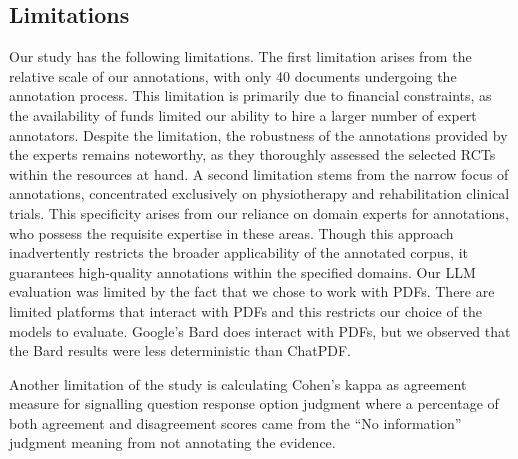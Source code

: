 \documentclass[sn-mathphys,Numbered]{sn-jnl}%
\theoremstyle{thmstyleone}%
\theoremstyle{thmstyletwo}%
\theoremstyle{thmstylethree}%
\begin{document}
\subsection{Limitations}
\label{subsec:limits}
%
Our study has the following limitations.
The first limitation arises from the relative scale of our annotations, with only 40 documents undergoing the annotation process.
This limitation is primarily due to financial constraints, as the availability of funds limited our ability to hire a larger number of expert annotators.
Despite the limitation, the robustness of the annotations provided by the experts remains noteworthy, as they thoroughly assessed the selected RCTs within the resources at hand.
A second limitation stems from the narrow focus of annotations, concentrated exclusively on physiotherapy and rehabilitation clinical trials.
This specificity arises from our reliance on domain experts for annotations, who possess the requisite expertise in these areas.
Though this approach inadvertently restricts the broader applicability of the annotated corpus, it guarantees high-quality annotations within the specified domains.
Our LLM evaluation was limited by the fact that we chose to work with PDFs. 
There are limited platforms that interact with PDFs and this restricts our choice of the models to evaluate.
Google's Bard does interact with PDFs, but we observed that the Bard results were less deterministic than ChatPDF.

Another limitation of the study is calculating Cohen's kappa as agreement measure for signalling question response option judgment where a percentage of both agreement and disagreement scores came from the ``No information'' judgment meaning from not annotating the evidence. %
\end{document}

